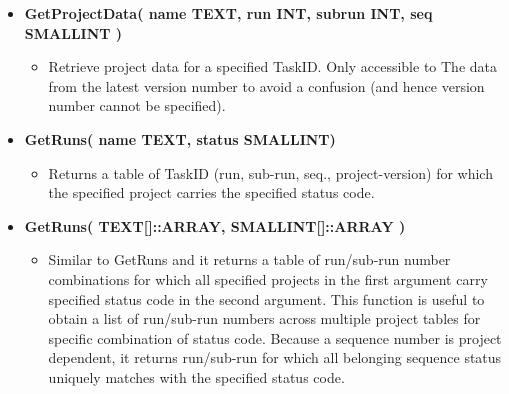 \begin{itemize}
\begin{itemize}
    \end{itemize}
  \item {\bf GetProjectData( name TEXT, run INT, subrun INT, seq SMALLINT )}
    \begin{itemize}
      \item Retrieve project data for a specified TaskID. Only accessible to
        The data from the latest version number to avoid a confusion (and
        hence version number cannot be specified).
    \end{itemize}
  \item {\bf GetRuns( name TEXT, status SMALLINT) }
    \begin{itemize}
      \item Returns a table of TaskID (run, sub-run, seq., project-version) 
        for which the specified project carries the specified status code.
    \end{itemize}
  \item {\bf GetRuns( TEXT[]::ARRAY, SMALLINT[]::ARRAY )}
    \begin{itemize}
      \item Similar to GetRuns and it returns a table of run/sub-run number 
      combinations for which all specified projects in the first argument
      carry specified status code in the second argument. This function
      is useful to obtain a list of run/sub-run numbers across multiple
      project tables for specific combination of status code. Because 
      a sequence number is project dependent, it returns run/sub-run for
      which all belonging sequence status uniquely matches with the specified
      status code.
    \end{itemize}

\end{itemize}


